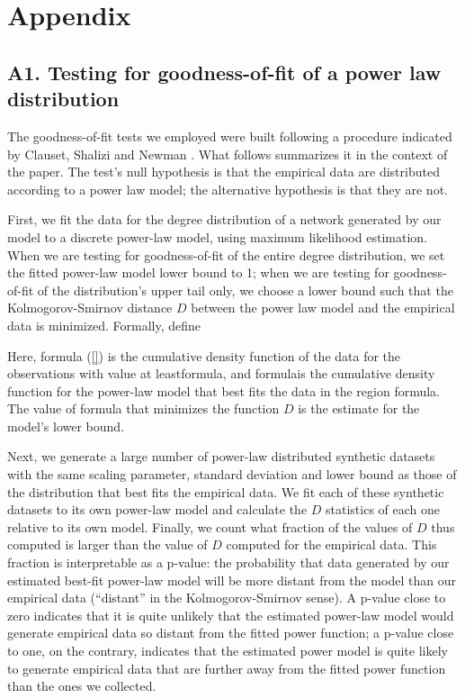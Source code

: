 \section*{Appendix}
\subsection*{A1. Testing for goodness-of-fit of a power law distribution}

The goodness-of-fit tests we employed were built following a procedure indicated by Clauset, Shalizi and Newman \cite[pp. 15-18]{clauset2009power}. What follows summarizes it in the context of the paper. The test's null hypothesis is that the empirical data are distributed according to a power law model; the alternative hypothesis is that they are not.

First, we fit the data for the degree distribution of a network generated by our model to a discrete power-law model, using maximum likelihood estimation. When we are testing for goodness-of-fit of the entire degree distribution, we set the fitted power-law model lower bound to 1; when we are testing for goodness-of-fit of the distribution's upper tail only, we choose a lower bound  such that the Kolmogorov-Smirnov distance $D$ between the power law model and the empirical data is minimized. Formally, define

Here, formula (\ref{}) is the cumulative density function of the data for the observations with value at leastformula, and formulais the cumulative density function for the power-law model that best fits the data in the region formula. The value of formula that minimizes the function $D$ is the estimate for the model's lower bound.

Next, we generate a large number of power-law distributed synthetic datasets with the same scaling parameter, standard deviation and lower bound as those of the distribution that best fits the empirical data. We fit each of these synthetic datasets to its own power-law model and calculate the $D$ statistics of each one relative to its own model. Finally, we count what fraction of the values of $D$ thus computed is larger than the value of $D$ computed for the empirical data. This fraction is interpretable as a p-value: the probability that data generated by our estimated best-fit power-law model will be more distant from the model than our empirical data (``distant'' in the Kolmogorov-Smirnov sense). A p-value close to zero indicates that it is quite unlikely that the estimated power-law model would generate empirical data so distant from the fitted power function; a p-value close to one, on the contrary, indicates that the estimated power model is quite likely to generate empirical data that are further away from the fitted power function than the ones we collected. 

